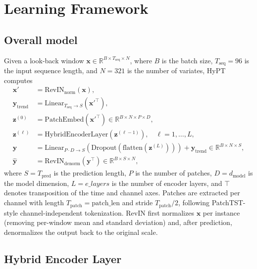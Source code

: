 \documentclass[10pt,journal]{IEEEtran}
\begin{document}
\section{Learning Framework}
\label{sec:framework}

\subsection{Overall model}
\label{sec:overall_model}

Given a look-back window $\bm{x} \in \mathbb{R}^{B \times T_{\mathrm{seq}} \times N}$, where $B$ is the batch size, $T_{\mathrm{seq}} = 96$ is the input sequence length, and $N = 321$ is the number of variates, HyPT computes
\begin{align}
\label{eq:revin_norm}
\bm{x}' &= \mathrm{RevIN}_{\mathrm{norm}}(\bm{x}), \\
\label{eq:trend}
\bm{y}_{\mathrm{trend}} &= \mathrm{Linear}_{T_{\mathrm{seq}} \to S}\!\left({\bm{x}'}^{\!\top}\right), \\
\label{eq:patchembed}
\bm{z}^{(0)} &= \mathrm{PatchEmbed}\!\left({\bm{x}'}^{\!\top}\right) \in \mathbb{R}^{B \times N \times P \times D}, \\
\label{eq:encoder_layer}
\bm{z}^{(\ell)} &= \mathrm{HybridEncoderLayer}\!\left(\bm{z}^{(\ell-1)}\right), \quad \ell = 1, \dots, L, \\
\label{eq:projection}
\bm{y} &= \mathrm{Linear}_{P \cdot D \to S}\!\left(\mathrm{Dropout}\!\left(\mathrm{flatten}\!\left(\bm{z}^{(L)}\right)\right)\right) + \bm{y}_{\mathrm{trend}} \in \mathbb{R}^{B \times N \times S}, \\
\label{eq:revin_denorm}
\hat{\bm{y}} &= \mathrm{RevIN}_{\mathrm{denorm}}\!\left(\bm{y}^{\!\top}\right) \in \mathbb{R}^{B \times S \times N},
\end{align}
where $S = T_{\mathrm{pred}}$ is the prediction length, $P$ is the number of patches, $D = d_{\mathrm{model}}$ is the model dimension, $L = e\_layers$ is the number of encoder layers, and $\top$ denotes transposition of the time and channel axes. Patches are extracted per channel with length $T_{\mathrm{patch}} = \mathrm{patch\_len}$ and stride $T_{\mathrm{patch}}/2$, following PatchTST-style channel-independent tokenization. RevIN first normalizes $\bm{x}$ per instance (removing per-window mean and standard deviation) and, after prediction, denormalizes the output back to the original scale.

\subsection{Hybrid Encoder Layer}
\label{sec:hybrid_encoder}
\end{document}
